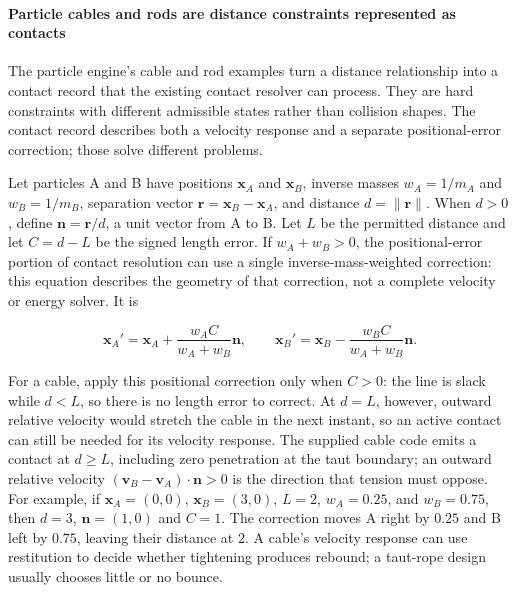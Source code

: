 \paragraph{Particle cables and rods are distance constraints represented as contacts}\label{06-engine-ii-ch033-particle-cables-and-rods-are-distance-constraints-represented-as-contacts}

The particle engine's cable and rod examples turn a distance relationship into a contact record that the existing contact resolver can process. They are hard constraints with different admissible states rather than collision shapes. The contact record describes both a velocity response and a separate positional-error correction; those solve different problems.

Let particles A and B have positions \(\mathbf{x}_A\) and \(\mathbf{x}_B\), inverse masses \(w_A=1/m_A\) and \(w_B=1/m_B\), separation vector \(\mathbf{r}=\mathbf{x}_B-\mathbf{x}_A\), and distance \(d=\lVert\mathbf{r}\rVert\). When \(d>0\), define \(\mathbf{n}=\mathbf{r}/d\), a unit vector from A to B. Let \(L\) be the permitted distance and let \(C=d-L\) be the signed length error. If \(w_A+w_B>0\), the positional-error portion of contact resolution can use a single inverse-mass-weighted correction: this equation describes the geometry of that correction, not a complete velocity or energy solver. It is

\[
\mathbf{x}_A' = \mathbf{x}_A + \frac{w_A C}{w_A+w_B}\mathbf{n}, \qquad
\mathbf{x}_B' = \mathbf{x}_B - \frac{w_B C}{w_A+w_B}\mathbf{n}.
\]

For a cable, apply this positional correction only when \(C>0\): the line is slack while \(d<L\), so there is no length error to correct. At \(d=L\), however, outward relative velocity would stretch the cable in the next instant, so an active contact can still be needed for its velocity response. The supplied cable code emits a contact at \(d\geq L\), including zero penetration at the taut boundary; an outward relative velocity \((\mathbf v_B-\mathbf v_A)\cdot\mathbf n>0\) is the direction that tension must oppose. For example, if \(\mathbf{x}_A=(0,0)\), \(\mathbf{x}_B=(3,0)\), \(L=2\), \(w_A=0.25\), and \(w_B=0.75\), then \(d=3\), \(\mathbf{n}=(1,0)\) and \(C=1\). The correction moves A right by \(0.25\) and B left by \(0.75\), leaving their distance at \(2\). A cable's velocity response can use restitution to decide whether tightening produces rebound; a taut-rope design usually chooses little or no bounce.

